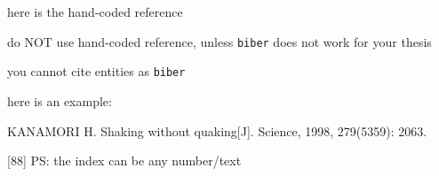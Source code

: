 \begin{manref}
\item here is the hand-coded reference
\item do NOT use hand-coded reference, unless \texttt{biber} does not work for your thesis
\item you cannot cite entities as \texttt{biber}
\item here is an example:
\item KANAMORI H. Shaking without quaking[J]. Science, 1998, 279(5359): 2063.
\item[{[88]}] PS: the index can be any number/text
\end{manref}
